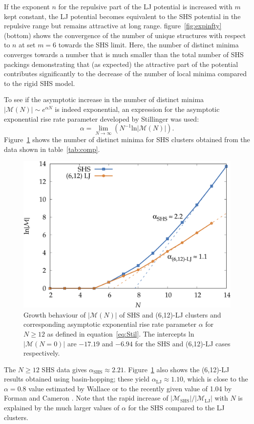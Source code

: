 If the exponent $n$ for the repulsive part of the \ac{LJ} potential is increased with
$m$ kept constant, the \ac{LJ} potential becomes equivalent to the \ac{SHS}
potential in the repulsive range but remains attractive at long range.
figure~\ref{fig:expinfty} (bottom) shows the convergence of the number of unique
structures with respect to $n$ at set $m=6$ towards the \ac{SHS} limit. Here,
the number of distinct minima converges towards a number that is much smaller
than the total number of \ac{SHS} packings demonstrating that (as expected) the
attractive part of the potential contributes significantly to the decrease of
the number of local minima compared to the rigid \ac{SHS} model.

To see if the asymptotic increase in the number of distinct minima
$|\mathcal{M}(N)| \sim e^{\alpha N}$ is indeed exponential, an expression for
the asymptotic exponential rise rate parameter developed by Stillinger was
used:\autocite{Stillinger_Exponentialmultiplicityinherent_1999}
%
\begin{equation} \label{eq:Stil}
\alpha = \lim_{N\rightarrow \infty} \left( N^{-1} \mathrm{ln} |\mathcal{M}(N)| \right).
\end{equation}
%
Figure~\ref{fig:asympt} shows the number of distinct minima for \ac{SHS}
clusters obtained from the data shown in table~\ref{tab:comp}. 
%
\begin{figure}[htb]
    \centering
    \includegraphics[width=0.8\columnwidth]{kslj/growth.pdf}
    \caption{Growth behaviour of $|\mathcal{M}(N)|$ of \acs{SHS} and (6,12)-\acs{LJ}
    clusters and corresponding asymptotic exponential rise rate parameter
    $\alpha$ for $N \geq 12$ as defined in equation~\eqref{eq:Stil}.  The
    intercepts ln$|\mathcal{M}(N=0)|$ are $-17.19$ and $-6.94$ for the \acs{SHS}
    and (6,12)-\acs{LJ} cases respectively.}
    \label{fig:asympt}
\end{figure}
%
The $N \geq 12$ \ac{SHS} data gives $\alpha_\mathrm{SHS}\approx 2.21$.
Figure~\ref{fig:asympt} also shows the (6,12)-\ac{LJ} results obtained using
basin-hopping; these yield $\alpha_\mathrm{LJ}\approx 1.10$, which is close to
the $\alpha=0.8$ value estimated by Wallace \autocite{Wallace-1997} or to the
recently given value of 1.04 by Forman and Cameron
\autocite{Forman_ModelingAggregationProcesses_2017}. Note that the rapid
increase of $|\mathcal{M}_\mathrm{SHS}|/|\mathcal{M}_\mathrm{LJ}|$ with $N$ is
explained by the much larger values of $\alpha$ for the \ac{SHS} compared to the
\ac{LJ} clusters.

